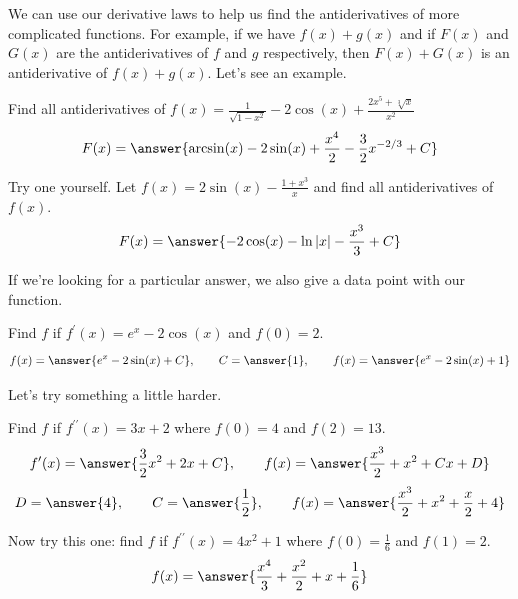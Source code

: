 \documentclass{ximera}
\begin{document}
We can use our derivative laws to help us find the antiderivatives of more complicated functions. For example, if we have $f(x)+g(x)$ and if $F(x)$ and $G(x)$ are the antiderivatives of $f$ and $g$ respectively, then $F(x)+G(x)$ is an antiderivative of $f(x)+g(x)$. Let's see an example.

\begin{example}\label{example:11-5}
Find all antiderivatives of $f(x)=\frac{1}{\sqrt{1-x^{2}}}-2 \cos (x)+\frac{2 x^{5}+\sqrt[3]{x}}{x^{2}}$
\[
F(x)=\answer{\arcsin(x)-2\sin(x)+\frac{x^{4}}{2}-\frac{3}{2}x^{-2/3}+C}
\]
\end{example}

\begin{exercise}\label{exercise:11-6}
Try one yourself. Let $f(x)=2 \sin (x)-\frac{1+x^{3}}{x}$ and find all antiderivatives of $f(x)$.
\[
F(x)=\answer{-2\cos(x)-\ln|x|-\frac{x^{3}}{3}+C}
\]
\end{exercise}

If we're looking for a particular answer, we also give a data point with our function.

\begin{example}\label{example:11-7}
Find $f$ if $f^{\prime}(x)=e^{x}-2 \cos (x)$ and $f(0)=2$.
\[
f(x)=\answer{e^{x}-2\sin(x)+C}, \qquad C=\answer{1}, \qquad f(x)=\answer{e^{x}-2\sin(x)+1}
\]
\end{example}

Let's try something a little harder.

\begin{example}\label{example:11-8}
Find $f$ if $f^{\prime \prime}(x)=3 x+2$ where $f(0)=4$ and $f(2)=13$.
\[
f^{\prime}(x)=\answer{\frac{3}{2}x^{2}+2x+C}, \qquad f(x)=\answer{\frac{x^{3}}{2}+x^{2}+Cx+D}
\]
\[
D=\answer{4}, \qquad C=\answer{\frac{1}{2}}, \qquad f(x)=\answer{\frac{x^{3}}{2}+x^{2}+\frac{x}{2}+4}
\]
\end{example}

\begin{exercise}\label{exercise:11-9}
Now try this one: find $f$ if $f^{\prime \prime}(x)=4 x^{2}+1$ where $f(0)=\frac{1}{6}$ and $f(1)=2$.
\[
f(x)=\answer{\frac{x^{4}}{3}+\frac{x^{2}}{2}+x+\frac{1}{6}}
\]
\end{exercise}
\end{document}
